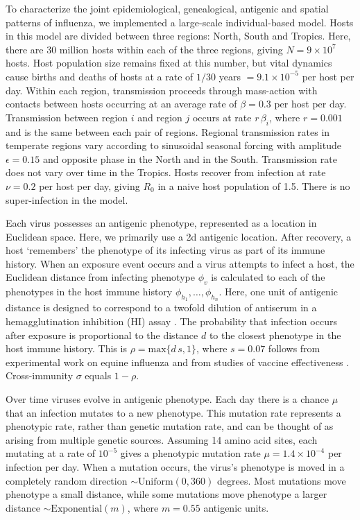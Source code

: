 \documentclass[11pt,oneside,letterpaper]{article}
\begin{document}
To characterize the joint epidemiological, genealogical, antigenic and spatial patterns of influenza, we implemented a large-scale individual-based model.  Hosts in this model are divided between three regions: North, South and Tropics.  Here, there are 30 million hosts within each of the three regions, giving $N = 9 \times 10^{7}$ hosts.  Host population size remains fixed at this number, but vital dynamics cause births and deaths of hosts at a rate of $1 / 30$ years $= 9.1 \times 10^{-5}$ per host per day.  Within each region, transmission proceeds through mass-action with contacts between hosts occurring at an average rate of $\beta = 0.3$ per host per day.  Transmission between region $i$ and region $j$ occurs at rate $r\,\beta_i$, where $r=0.001$ and is the same between each pair of regions.  Regional transmission rates in temperate regions vary according to sinusoidal seasonal forcing with amplitude $\epsilon = 0.15$ and opposite phase in the North and in the South.  Transmission rate does not vary over time in the Tropics.  Hosts recover from infection at rate $\nu = 0.2$ per host per day, giving $R_0$ in a naive host population of 1.5.  There is no super-infection in the model.

Each virus possesses an antigenic phenotype, represented as a location in Euclidean space.  Here, we primarily use a 2d antigenic location.  After recovery, a host `remembers' the phenotype of its infecting virus as part of its immune history.  When an exposure event occurs and a virus attempts to infect a host, the Euclidean distance from infecting phenotype $\phi_v$ is calculated to each of the phenotypes in the host immune history $\phi_{h_1}, \dots, \phi_{h_n}$.  Here, one unit of antigenic distance is designed to correspond to a twofold dilution of antiserum in a hemagglutination inhibition (HI) assay \cite{Smith04}. The probability that infection occurs after exposure is proportional to the distance $d$ to the closest phenotype in the host immune history.  This is $\rho = \textrm{max}\{d\,s,1\}$, where $s=0.07$ follows from experimental work on equine influenza \cite{Park09} and from studies of vaccine effectiveness \cite{Gupta06}.  Cross-immunity $\sigma$ equals $1-\rho$.

Over time viruses evolve in antigenic phenotype.  Each day there is a chance $\mu$ that an infection mutates to a new phenotype.  This mutation rate represents a phenotypic rate, rather than genetic mutation rate, and can be thought of as arising from multiple genetic sources.  Assuming 14 amino acid sites, each mutating at a rate of $10^{-5}$ gives a phenotypic mutation rate $\mu = 1.4 \times 10^{-4}$ per infection per day.  When a mutation occurs, the virus's phenotype is moved in a completely random direction $\sim \textrm{Uniform}(0,360)$ degrees.  Most mutations move phenotype a small distance, while some mutations move phenotype a larger distance $\sim \textrm{Exponential}(m)$, where $m = 0.55$ antigenic units.
\end{document}
